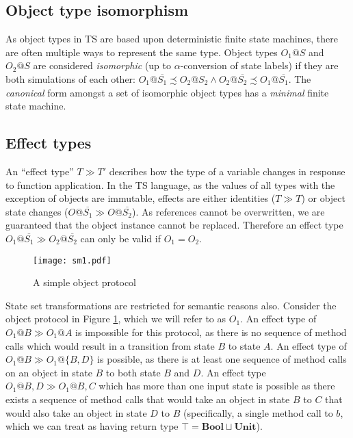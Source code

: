 \documentclass[preprint]{sigplanconf}
\newcommand{\figref}[1]{Figure \ref{#1}}
\newcommand{\unitt}{\mathbf{Unit}}
\newcommand{\boolt}{\mathbf{Bool}}
\begin{document}
\subsection{Object type isomorphism}

As object types in TS are based upon deterministic finite state machines,
there are often multiple ways to represent the same type. Object types
$O_1@S$ and $O_2@S$ are considered {\it isomorphic} 
(up to $\alpha$-conversion of state labels)
if they are both simulations of each other:
$O_1@\overline{S_1} \precsim O_2@S_2 \wedge O_2@\overline{S_2} \precsim O_1@\overline{S_1}$. 
The
{\it canonical} form amongst a set of isomorphic object types has a
{\it minimal} finite state machine.

\subsection{Effect types}

An ``effect type'' $T \gg T'$ describes how the type of a variable changes
in response to function application. In the TS language, as the values of
all types with the exception of objects are immutable, effects are
either identities ($T \gg T$) or object state changes 
($O@\overline{S_1} \gg O@\overline{S_2}$). As references cannot
be overwritten, we are guaranteed that the object instance cannot be replaced.
Therefore an effect type $O_1@\overline{S_1} \gg O_2@\overline{S_2}$ can
only be valid if $O_1 = O_2$.

\begin{figure}
\texttt{[image: sm1.pdf]}
\caption{\label{fig:sm1} A simple object protocol}
\end{figure}

State set transformations are restricted for semantic reasons also. Consider
the object protocol in \figref{fig:sm1}, which we will refer to as $O_1$.
An effect type of $O_1@B \gg O_1@A$ is impossible for this protocol, as there
is no sequence of method calls which would result in a transition from state
$B$ to state $A$. An effect type of $O_1@B \gg O_1@\{B,D\}$ is possible, 
as there is at least one sequence of method calls on an object in
state $B$ to both state $B$ and $D$.
An effect type $O_1@{B,D} \gg O_1@{B,C}$ which has more than one input state
is possible as there exists a sequence of method calls 
that would take an object in state $B$ to $C$ that would also
take an object in state $D$ to $B$ (specifically, a single method
call to $b$, which we can treat as having return type $\top = \boolt \sqcup \unitt$).
\end{document}
